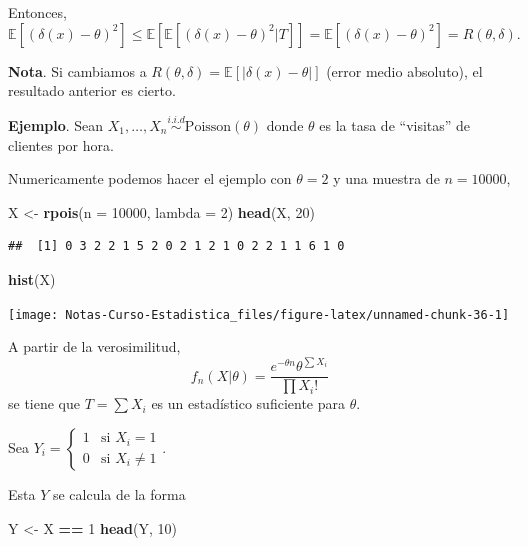 \documentclass[
  12pt,
]{book}
\newenvironment{Shaded}{\begin{snugshade}}{\end{snugshade}}
\newcommand{\DataTypeTok}[1]{\textcolor[rgb]{0.13,0.29,0.53}{#1}}
\newcommand{\DecValTok}[1]{\textcolor[rgb]{0.00,0.00,0.81}{#1}}
\newcommand{\KeywordTok}[1]{\textcolor[rgb]{0.13,0.29,0.53}{\textbf{#1}}}
\newcommand{\NormalTok}[1]{#1}
\newcommand{\OperatorTok}[1]{\textcolor[rgb]{0.81,0.36,0.00}{\textbf{#1}}}
\newcommand{\StringTok}[1]{\textcolor[rgb]{0.31,0.60,0.02}{#1}}
\begin{document}
Entonces,
\[ \mathbb E[(\delta(x)-\theta)^2] \leq \mathbb E[\mathbb E[(\delta(x)-\theta)^2|T]] = \mathbb E[(\delta(x)-\theta)^2] = R(\theta,\delta).\]

\textbf{Nota}. Si cambiamos a \(R(\theta,\delta) = \mathbb E[|\delta(x)-\theta|]\) (error medio absoluto), el resultado anterior es cierto.

\textbf{Ejemplo}. Sean \(X_1,\dots, X_n \stackrel{i.i.d}{\sim} \text{Poisson}(\theta)\) donde \(\theta\) es la tasa de ``visitas'' de clientes por hora.

Numericamente podemos hacer el ejemplo con \(\theta = 2\) y una muestra de \(n = 10000\),

\begin{Shaded}
\begin{Highlighting}[]
\NormalTok{X \textless{}{-}}\StringTok{ }\KeywordTok{rpois}\NormalTok{(}\DataTypeTok{n =} \DecValTok{10000}\NormalTok{, }\DataTypeTok{lambda =} \DecValTok{2}\NormalTok{)}
\KeywordTok{head}\NormalTok{(X, }\DecValTok{20}\NormalTok{)}
\end{Highlighting}
\end{Shaded}

\begin{verbatim}
##  [1] 0 3 2 2 1 5 2 0 2 1 2 1 0 2 2 1 1 6 1 0
\end{verbatim}

\begin{Shaded}
\begin{Highlighting}[]
\KeywordTok{hist}\NormalTok{(X)}
\end{Highlighting}
\end{Shaded}

\begin{center}\texttt{[image: Notas-Curso-Estadistica\_files/figure-latex/unnamed-chunk-36-1]} \end{center}

A partir de la verosimilitud,
\[f_n(X|\theta) = \dfrac{e^{-\theta n} \theta^{\sum X_i}}{\prod X_i!} \]
se tiene que \(T=\sum X_i\) es un estadístico suficiente para \(\theta\).

Sea \(Y_i = \begin{cases} 1 & \text{si } X_i = 1\\ 0 & \text{si } X_i \ne 1\end{cases}\).

Esta \(Y\) se calcula de la forma

\begin{Shaded}
\begin{Highlighting}[]
\NormalTok{Y \textless{}{-}}\StringTok{ }\NormalTok{X }\OperatorTok{==}\StringTok{ }\DecValTok{1}
\KeywordTok{head}\NormalTok{(Y, }\DecValTok{10}\NormalTok{)}
\end{Highlighting}
\end{Shaded}
\end{document}
